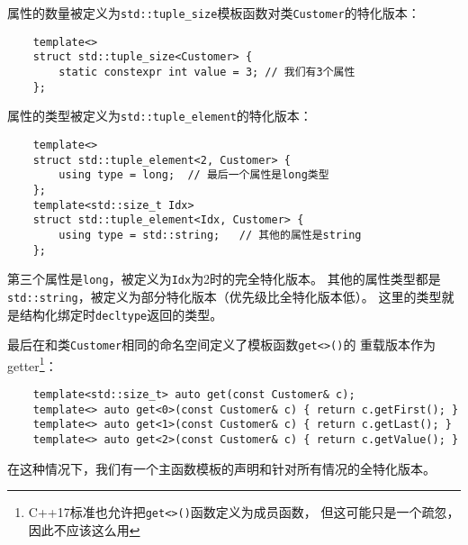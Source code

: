 属性的数量被定义为\texttt{std::tuple\_size}模板函数对类\texttt{Customer}的特化版本：
\begin{lstlisting}
    template<>
    struct std::tuple_size<Customer> {
        static constexpr int value = 3; // 我们有3个属性
    };
\end{lstlisting}
属性的类型被定义为\texttt{std::tuple\_element}的特化版本：
\begin{lstlisting}
    template<>
    struct std::tuple_element<2, Customer> {
        using type = long;  // 最后一个属性是long类型
    };
    template<std::size_t Idx>
    struct std::tuple_element<Idx, Customer> {
        using type = std::string;   // 其他的属性是string
    };
\end{lstlisting}
第三个属性是\texttt{long}，被定义为\texttt{Idx}为2时的完全特化版本。
其他的属性类型都是\texttt{std::string}，被定义为部分特化版本（优先级比全特化版本低）。
这里的类型就是结构化绑定时\texttt{decltype}返回的类型。

最后在和类\texttt{Customer}相同的命名空间定义了模板函数\texttt{get<>()}的
重载版本作为getter\footnote{C++17标准也允许把\texttt{get<>()}函数定义为成员函数，
但这可能只是一个疏忽，因此不应该这么用}：
\begin{lstlisting}
    template<std::size_t> auto get(const Customer& c);
    template<> auto get<0>(const Customer& c) { return c.getFirst(); }
    template<> auto get<1>(const Customer& c) { return c.getLast(); }
    template<> auto get<2>(const Customer& c) { return c.getValue(); }
\end{lstlisting}
在这种情况下，我们有一个主函数模板的声明和针对所有情况的全特化版本。

